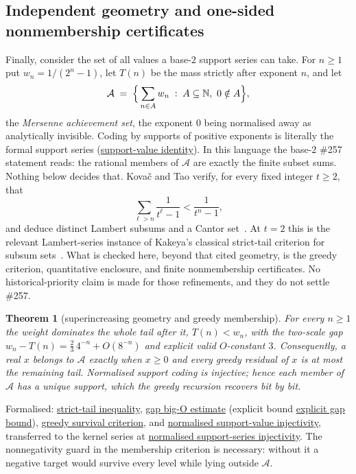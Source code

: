 \documentclass[11pt]{article}
\newcommand{\commit}{ebc98ee71f6819bd9fe344a0bb343542c604e533}
\newcommand{\repobase}{https://github.com/wcook04/plectis-lean-erdos249-257/blob/\commit}
\newcommand{\PK}{Erdos249257}
\newcommand{\lword}[4]{\href{\repobase/\PK/#1\#L#2}{#4}}
\newtheorem{theorem}{Theorem}[section]
\theoremstyle{definition}
\theoremstyle{remark}
\newcommand{\N}{\mathbb{N}}
\begin{document}
\subsection{Independent geometry and one-sided nonmembership certificates}
\label{app:carry-geometry}

Finally, consider the set of all values a base-$2$ support series can
take. For $n\ge1$ put $w_n=1/(2^n-1)$, let $T(n)$ be the mass strictly after
exponent $n$, and let
\[
\mathcal A\;=\;\Bigl\{\,\sum_{n\in A}w_n \;:\; A\subseteq\N,\ 0\notin A\Bigr\},
\]
the \emph{Mersenne achievement set}, the exponent $0$ being normalised away as
analytically invisible. Coding by supports of positive exponents is literally
the formal support series
(\lword{GreedyAchievementSet.lean}{554}{positiveMersenneSupportValue_eq_erdosSupportSeries}{support-value identity}). In
this language the base-$2$ \#257 statement reads: the rational members of
$\mathcal A$ are exactly the finite subset sums. Nothing below decides that.
Kova\v{c} and Tao verify, for every fixed integer $t\ge2$, that
\[
  \sum_{\ell>n}\frac1{t^\ell-1}<\frac1{t^n-1},
\]
and deduce distinct Lambert subsums and a Cantor set~\cite[Remark~4.1]{kovactao}. At
$t=2$ this is the relevant Lambert-series instance of Kakeya's classical
strict-tail criterion for subsum sets~\cite{kakeya1914}. What is checked here,
beyond that cited geometry, is the greedy criterion, quantitative enclosure,
and finite nonmembership certificates.  No historical-priority claim is made
for those refinements, and they do not settle \#257.

\begin{theorem}[superincreasing geometry and greedy membership]\label{res:greedy-details}
For every $n\ge1$ the weight dominates the whole tail after it, $T(n)<w_n$,
with the two-scale gap $w_n-T(n)=\tfrac23\,4^{-n}+O(8^{-n})$ and explicit
valid $O$-constant $3$. Consequently, a real $x$ belongs to $\mathcal A$
exactly when $x\ge0$ and every greedy residual of $x$ is at most the remaining
tail. Normalised support coding is injective; hence each member of $\mathcal A$
has a unique support, which the greedy recursion recovers bit by bit.
\end{theorem}
\noindent Formalised:
\lword{GreedyAchievementSet.lean}{180}{mersenneTail_lt_weight}{strict-tail inequality},
\lword{GreedyAchievementSet.lean}{473}{mersenneGap_isBigOWith}{gap big-O estimate} (explicit bound
\lword{GreedyAchievementSet.lean}{448}{mersenneGap_asymptotic_bound}{explicit gap bound}),
\lword{GreedyAchievementSet.lean}{1445}{mem_mersenneAchievementSet_iff_greedy_survival}{greedy survival criterion},
and
\lword{GreedyAchievementSet.lean}{1527}{positiveMersenneSupportValue_injective_normalized}{normalised support-value injectivity},
transferred to the kernel series at
\lword{GreedyAchievementSet.lean}{1536}{erdosSupportSeries_two_injective_normalized}{normalised support-series injectivity}.
The nonnegativity guard in the membership criterion is necessary: without it a
negative target would survive every level while lying outside $\mathcal A$.
\end{document}
